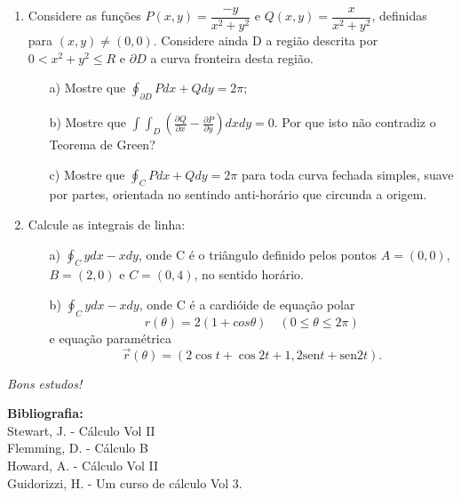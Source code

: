 \documentclass[a4paper,5pt]{amsbook}
\newcommand{\sen}{\text{sen}}
\numberwithin{equation}{chapter}
\begin{document}
\begin{enumerate}
\item Considere as fun\c{c}\~oes $P(x,y)=\dfrac{-y}{x^2+y^2}$ e $Q(x,y)=\dfrac{x}{x^2+y^2}$, definidas para $(x,y)\neq (0,0)$. Considere ainda D a regi\~ao descrita por $0<x^2+y^2\leq R$ e $\partial D$ a curva fronteira desta regi\~ao.
 \begin{itemize}
  \item[a)] Mostre que $\displaystyle\oint_{\partial D}Pdx+Qdy = 2\pi;$\\
  \item[b)]Mostre que $\displaystyle\int\int_D\left(\frac{\partial Q}{\partial x} - \frac{\partial P}{\partial y}\right)dxdy = 0.$ Por que isto n\~ao contradiz o Teorema de Green?\\
  \item[c)]  Mostre que $\displaystyle\oint_{C}Pdx+Qdy = 2\pi$ para toda curva fechada simples, suave por partes, orientada no sentindo anti-hor\'ario que circunda a origem.\\
 \end{itemize}
 \item Calcule as integrais de linha:
\begin{itemize}
 \item[a)]$\displaystyle\oint_{C}ydx - xdy$, onde C \'e o tri\^angulo definido pelos pontos $A=(0,0)$, $B=(2,0)$ e $C=(0,4)$, no sentido hor\'ario.\\
  \item[b)]$\displaystyle\oint_{C}ydx - xdy$, onde C \'e a cardi\'oide de equa\c{c}\~ao polar $$r(\theta)=2(1+cos\theta)\quad (0\leq \theta\leq 2\pi)$$ e equa\c{c}\~ao param\'etrica  $$\overrightarrow{r}(\theta)=(2\cos t +\cos 2t+1,2\sen t +\sen 2t).$$
  
\end{itemize}


\end{enumerate}



 


\begin{flushright}
 \textit{ Bons estudos!}
\end{flushright}
\begin{center}
 \textbf{Bibliografia:}\\ Stewart, J. - C\'alculo Vol II\\ Flemming, D. - C\'alculo B \\ Howard, A. - C\'alculo Vol II\\ Guidorizzi, H. - Um curso de c\'alculo Vol 3.
\end{center}
\end{document}
